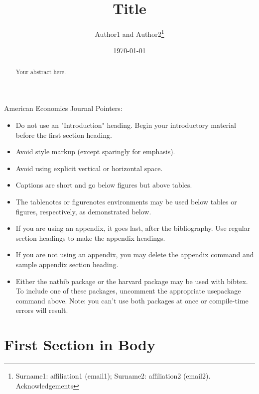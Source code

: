 \documentclass[AEJ]{AEA}
\begin{document}
\title{Title}
\author{Author1 and Author2\thanks{%
Surname1: affiliation1 (email1); Surname2: affiliation2 
(email2). Acknowledgements}}
\date{\today}

\begin{abstract}
Your abstract here.
\end{abstract}

\maketitle

American Economics Journal Pointers:

\begin{itemize}
\item Do not use an "Introduction" heading. Begin your introductory material
before the first section heading.

\item Avoid style markup (except sparingly for emphasis).

\item Avoid using explicit vertical or horizontal space.

\item Captions are short and go below figures but above tables.

\item The tablenotes or figurenotes environments may be used below tables
or figures, respectively, as demonstrated below.

\item If you are using an appendix, it goes last, after the bibliography.
Use regular section headings to make the appendix headings.

\item If you are not using an appendix, you may delete the appendix command
and sample appendix section heading.

\item Either the natbib package or the harvard package may be used with bibtex.
To include one of these packages, uncomment the appropriate usepackage command
above. Note: you can't use both packages at once or compile-time errors will result.

\end{itemize}

\section{First Section in Body}
\end{document}

